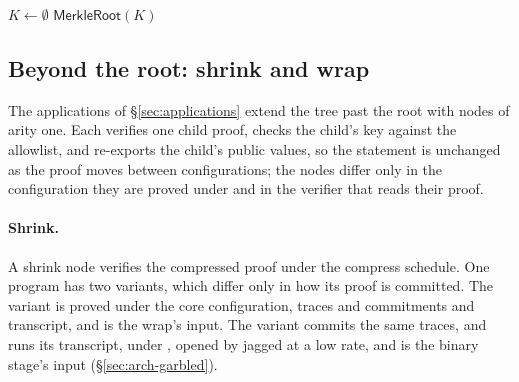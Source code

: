 \begin{algorithm}[!htb]
\caption{Enumerating the admissible leaf and compose keys. The loop bounds come from the
machine's chip clusters and from the bucket rule of \S\ref{sec:pcs-geometry};
no guest is executed.}
\label{alg:enum}
\DontPrintSemicolon
{}
$K \gets \emptyset$\;
\Return $\mathsf{MerkleRoot}(K)$\;
\end{algorithm}

\subsection{Beyond the root: shrink and wrap}
\label{sec:recursion-shrink-wrap}

The applications of \S\ref{sec:applications} extend the tree past the root with nodes of arity one. Each verifies one child proof, checks the child's key against the allowlist, and re-exports the child's public values, so the statement is unchanged as the proof moves between configurations; the nodes differ only in the configuration they are proved under and in the verifier that reads their proof.

\paragraph{Shrink.} A shrink node verifies the compressed proof under the compress schedule. One program has two variants, which differ only in how its proof is committed. The \Poseidon{} variant is proved under the core configuration, \KB{} traces and \Poseidon{} commitments and transcript, and is the wrap's input. The \Blake{} variant commits the same traces, and runs its transcript, under \Blake{}, opened by jagged \WHIR{} at a low rate, and is the binary stage's input (\S\ref{sec:arch-garbled}).

